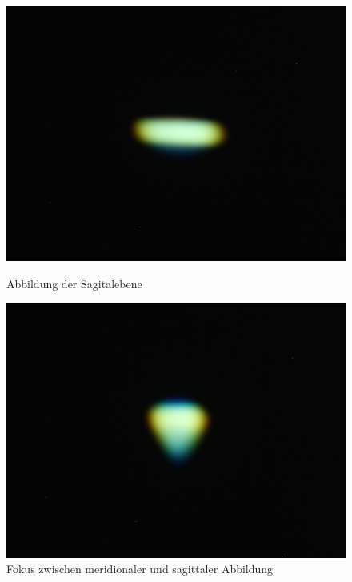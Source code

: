 \begin{figure}[h!]
	\begin{minipage}[t]{0.48\textwidth}
		\includegraphics[width=\linewidth]{img/Astigmatismus/Prakt_Linsenfehler_2015_06_04_087_saggital}
		\caption{Abbildung der Sagitalebene}
		\label{fig:astigmatismus_sagittal}
	\end{minipage}
	\hfill
	\begin{minipage}[t]{0.48\textwidth}
		\includegraphics[width=\linewidth]{img/Astigmatismus/Prakt_Linsenfehler_2015_06_04_089_mittenfokus}
		\caption{Fokus zwischen meridionaler und sagittaler Abbildung}
		\label{fig:astigmatismus_mittenfokus}
	\end{minipage}
\end{figure}

